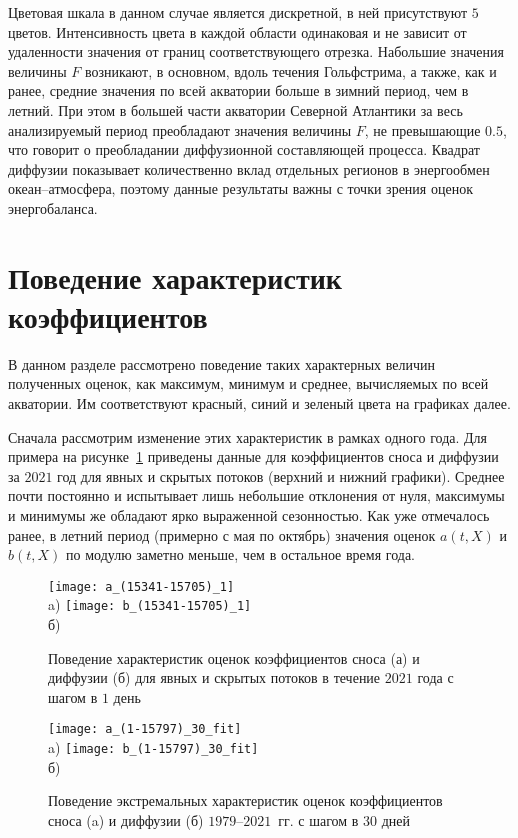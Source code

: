 Цветовая шкала в данном случае является дискретной, в ней присутствуют $5$ цветов. Интенсивность цвета в каждой области одинаковая и не зависит от удаленности значения от границ соответствующего отрезка. Набольшие значения величины $F$ возникают, в основном, вдоль течения Гольфстрима, а также, как и ранее, средние значения по всей акватории больше в зимний период, чем в летний. При этом в большей части акватории Северной Атлантики за весь анализируемый период преобладают значения величины $F$, не превышающие $0.5$, что говорит о преобладании диффузионной составляющей процесса. Квадрат диффузии показывает количественно вклад отдельных регионов в энергообмен океан--атмосфера, поэтому данные результаты важны с точки зрения оценок энергобаланса.

\section{Поведение характеристик коэффициентов}

В данном разделе рассмотрено поведение таких характерных величин полученных оценок, как максимум, минимум и среднее, вычисляемых по всей акватории.
Им соответствуют красный, синий и зеленый цвета на графиках далее.

Сначала рассмотрим изменение этих характеристик в рамках одного года. Для примера на рисунке~\ref{fig:ab_daily} приведены данные для коэффициентов сноса и диффузии за $2021$ год для явных и скрытых потоков (верхний и нижний графики).
Среднее почти постоянно и испытывает лишь небольшие отклонения от нуля, максимумы и минимумы же обладают ярко выраженной сезонностью. Как уже отмечалось ранее, в летний период (примерно с мая по октябрь) значения оценок $a(t,X)$ и $b(t,X)$ по модулю заметно меньше, чем в остальное время года. 

\begin{figure}[!h]
	\centering
	\texttt{[image: a\_(15341-15705)\_1]}\\
	a)
	\texttt{[image: b\_(15341-15705)\_1]}
	\\
	б)
	
	\caption{Поведение характеристик оценок коэффициентов сноса (а) и диффузии (б) для явных и скрытых потоков в течение $2021$ года с шагом в $1$ день}
	\label{fig:ab_daily}
\end{figure}

\begin{figure}[h!]
	\centering
	\texttt{[image: a\_(1-15797)\_30\_fit]}\\
	a)
	\texttt{[image: b\_(1-15797)\_30\_fit]}\\
	б)
	\caption{Поведение экстремальных характеристик оценок коэффициентов сноса (a) и диффузии (б) $1979$--$2021$~гг. с шагом в $30$ дней}
	\label{fig:ab_monthly}
\end{figure}

